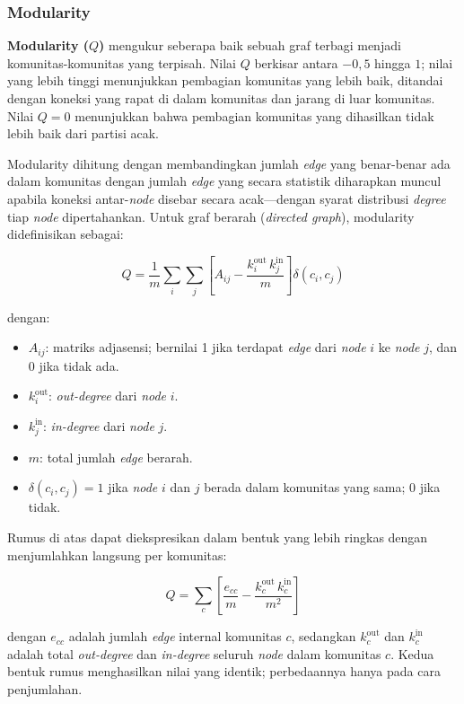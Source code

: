 \documentclass[main]{subfiles}
\begin{document}
\subsubsection{Modularity}

\textbf{Modularity ($Q$)} mengukur seberapa baik sebuah graf terbagi
menjadi komunitas-komunitas yang terpisah. Nilai $Q$ berkisar antara
$-0{,}5$ hingga $1$; nilai yang lebih tinggi menunjukkan pembagian
komunitas yang lebih baik, ditandai dengan koneksi yang rapat di dalam
komunitas dan jarang di luar komunitas. Nilai $Q = 0$ menunjukkan bahwa
pembagian komunitas yang dihasilkan tidak lebih baik dari partisi acak.

Modularity dihitung dengan membandingkan jumlah \textit{edge} yang
benar-benar ada dalam komunitas dengan jumlah \textit{edge} yang secara
statistik diharapkan muncul apabila koneksi antar-\textit{node} disebar secara
acak---dengan syarat distribusi \textit{degree} tiap \textit{node}
dipertahankan. Untuk graf berarah (\textit{directed graph}), modularity
didefinisikan sebagai:

\[
  Q = \frac{1}{m} \sum_{i} \sum_{j}
      \left[ A_{ij} - \frac{k_i^{\text{out}} \, k_j^{\text{in}}}{m}
      \right] \delta(c_i, c_j)
\]

\noindent dengan:

\begin{itemize}
  \item $A_{ij}$: matriks adjasensi; bernilai 1 jika terdapat
        \textit{edge} dari \textit{node} $i$ ke \textit{node} $j$, dan 0 jika tidak ada.
  \item $k_i^{\text{out}}$: \textit{out-degree} dari \textit{node} $i$.
  \item $k_j^{\text{in}}$: \textit{in-degree} dari \textit{node} $j$.
  \item $m$: total jumlah \textit{edge} berarah.
  \item $\delta(c_i, c_j) = 1$ jika \textit{node} $i$ dan $j$ berada dalam
        komunitas yang sama; 0 jika tidak.
\end{itemize}

Rumus di atas dapat diekspresikan dalam bentuk yang lebih ringkas dengan
menjumlahkan langsung per komunitas:

\[
  Q = \sum_{c} \left[
      \frac{e_{cc}}{m} - \frac{k_c^{\text{out}} \, k_c^{\text{in}}}{m^2}
      \right]
\]

\noindent dengan $e_{cc}$ adalah jumlah \textit{edge} internal komunitas
$c$, sedangkan $k_c^{\text{out}}$ dan $k_c^{\text{in}}$ adalah total
\textit{out-degree} dan \textit{in-degree} seluruh \textit{node} dalam komunitas
$c$. Kedua bentuk rumus menghasilkan nilai yang identik; perbedaannya
hanya pada cara penjumlahan.
\end{document}
